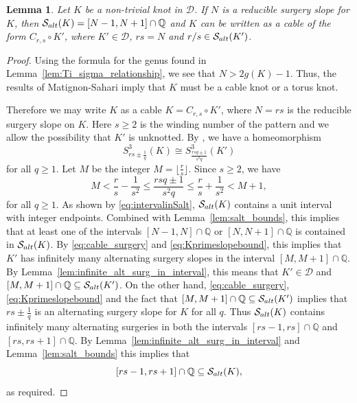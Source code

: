 \documentclass{amsart} %
\newcommand{\D}{\mathcal{D}}
\newcommand{\Q}{\mathbb{Q}}
\newcommand{\Salt}{\mathcal{S}_{\rm alt}}
\theoremstyle{thm}
\newtheorem{lem}[Theorem]{Lemma}
\theoremstyle{definition}
\numberwithin{equation}{section}
\begin{document}
\begin{lem}\label{lem:N_surgery_reducible}
    Let $K$ be a non-trivial knot in $\D$. If $N$ is a reducible surgery slope for $K$, then $\Salt(K)=[N-1,N+1]\cap \Q$ and $K$ can be written as a cable of the form $C_{r,s}\circ K'$, where $K'\in \D$, $rs=N$ and $r/s\in \Salt(K')$.
\end{lem}
\begin{proof}
Using the formula for the genus found in Lemma~\ref{lem:Ti_sigma_relationship}, we see that $N>2g(K)-1$. Thus, the results of Matignon-Sahari \cite{MS03} imply that $K$ must be a cable knot or a torus knot.

Therefore we may write $K$ as a cable $K=C_{r,s}\circ K'$, where $N=rs$ is the reducible surgery slope on $K$. Here $s\geq 2$ is the winding number of the pattern and we allow the possibility that $K'$ is unknotted. By \cite[Corollary~7.3]{Gordon1983Satellite}, we have a homeomorphism 
\begin{equation}\label{eq:cable_surgery}
S_{rs \pm \frac{1}{q}}^3(K) \cong S_{\frac{rsq \pm 1}{s^2q}}^3(K')
\end{equation}
for all $q\geq 1$. Let $M$ be the integer $M=\lfloor \frac{r}{s} \rfloor$. Since $s\geq 2$, we have
\begin{equation}\label{eq:Kprimeslopebound}
    M< \frac{r}{s}-\frac{1}{s^2} \leq  \frac{rsq \pm 1}{s^2q}\leq \frac{r}{s}+\frac{1}{s^2}<M+1,
\end{equation}
for all $q\geq 1$. As shown by \eqref{eq:intervalinSalt}, $\Salt(K)$ contains a unit interval with integer endpoints. Combined with Lemma~\ref{lem:salt_bounds}, this implies that at least one of the intervals $[N-1,N]\cap \Q$ or $[N,N+1]\cap \Q$ is contained in $\Salt(K)$. By \eqref{eq:cable_surgery} and \eqref{eq:Kprimeslopebound}, this implies that $K'$ has infinitely many alternating surgery slopes in the interval $[M,M+1]\cap \Q$. By Lemma~\ref{lem:infinite_alt_surg_in_interval}, this means that $K'\in \D$ and $\left[M,M+1 \right]\cap \Q \subseteq \Salt(K')$. On the other hand, \eqref{eq:cable_surgery}, \eqref{eq:Kprimeslopebound} and the fact that $\left[M,M+1 \right]\cap \Q \subseteq \Salt(K')$ implies that $rs\pm \frac{1}{q}$ is an alternating surgery slope for $K$ for all $q$. Thus $\Salt(K)$ contains infinitely many alternating surgeries in both the intervals $[rs-1,rs]\cap \Q$ and $[rs,rs+1]\cap \Q$. By Lemma~\ref{lem:infinite_alt_surg_in_interval} and Lemma~\ref{lem:salt_bounds} this implies that
\[
[rs-1,rs+1]\cap \Q\subseteq \Salt(K),
\]
as required.
\end{proof}
\end{document}
